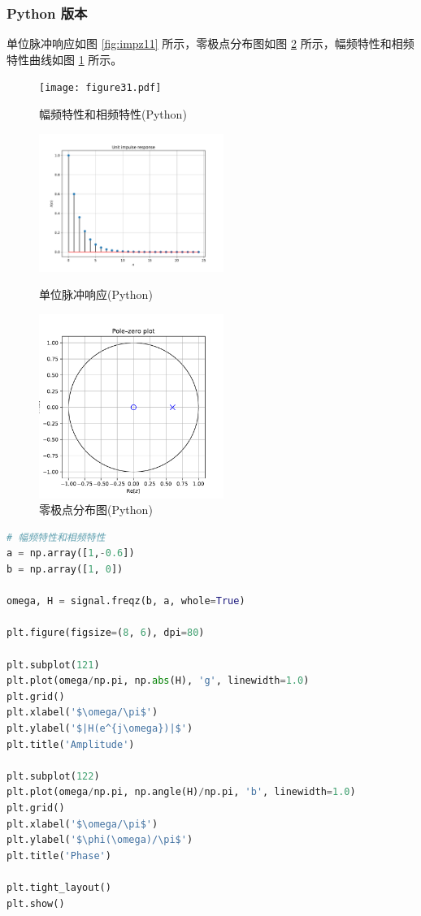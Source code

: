 \documentclass[12pt,AutoFakeBold]{article}
\begin{document}
\subsubsection{Python 版本}

单位脉冲响应如图 \ref{fig:impz11} 所示，零极点分布图如图 \ref{fig:zplane11} 所示，幅频特性和相频特性曲线如图 \ref{fig:figure31} 所示。

\begin{figure}[hbtp]
	\centering
	\texttt{[image: figure31.pdf]}
	\caption{幅频特性和相频特性(Python)}\label{fig:figure31}
\end{figure}

\begin{figure}[htbp]
	\centering
	\begin{minipage}[t]{0.48\textwidth}
		\centering
		\includegraphics[width=6cm]{figure/impz11.pdf}
		\caption{单位脉冲响应(Python)}\label{fig:impz11}
	\end{minipage}
	\begin{minipage}[t]{0.48\textwidth}
		\centering
		\includegraphics[width=6cm]{figure/zplane11.pdf}
		\caption{零极点分布图(Python)}\label{fig:zplane11}
	\end{minipage}
\end{figure}

\begin{lstlisting}[language=Python]
# 幅频特性和相频特性
a = np.array([1,-0.6])
b = np.array([1, 0])

omega, H = signal.freqz(b, a, whole=True)

plt.figure(figsize=(8, 6), dpi=80)

plt.subplot(121)
plt.plot(omega/np.pi, np.abs(H), 'g', linewidth=1.0)
plt.grid()
plt.xlabel('$\omega/\pi$')
plt.ylabel('$|H(e^{j\omega})|$')
plt.title('Amplitude')

plt.subplot(122)
plt.plot(omega/np.pi, np.angle(H)/np.pi, 'b', linewidth=1.0)
plt.grid()
plt.xlabel('$\omega/\pi$')
plt.ylabel('$\phi(\omega)/\pi$')
plt.title('Phase')

plt.tight_layout()
plt.show()
\end{lstlisting}
\end{document}
